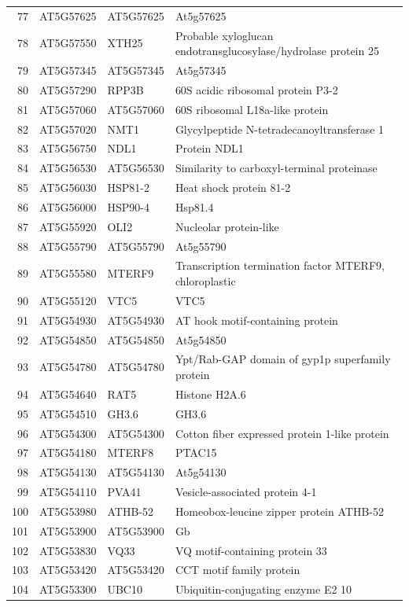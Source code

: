 \documentclass[11pt]{article}
\begin{document}
\begin{center}
\begin{tabular}{rlll}
77 & AT5G57625 & AT5G57625 & At5g57625\\
78 & AT5G57550 & XTH25 & Probable xyloglucan endotransglucosylase/hydrolase protein 25\\
79 & AT5G57345 & AT5G57345 & At5g57345\\
80 & AT5G57290 & RPP3B & 60S acidic ribosomal protein P3-2\\
81 & AT5G57060 & AT5G57060 & 60S ribosomal L18a-like protein\\
82 & AT5G57020 & NMT1 & Glycylpeptide N-tetradecanoyltransferase 1\\
83 & AT5G56750 & NDL1 & Protein NDL1\\
84 & AT5G56530 & AT5G56530 & Similarity to carboxyl-terminal proteinase\\
85 & AT5G56030 & HSP81-2 & Heat shock protein 81-2\\
86 & AT5G56000 & HSP90-4 & Hsp81.4\\
87 & AT5G55920 & OLI2 & Nucleolar protein-like\\
88 & AT5G55790 & AT5G55790 & At5g55790\\
89 & AT5G55580 & MTERF9 & Transcription termination factor MTERF9, chloroplastic\\
90 & AT5G55120 & VTC5 & VTC5\\
91 & AT5G54930 & AT5G54930 & AT hook motif-containing protein\\
92 & AT5G54850 & AT5G54850 & At5g54850\\
93 & AT5G54780 & AT5G54780 & Ypt/Rab-GAP domain of gyp1p superfamily protein\\
94 & AT5G54640 & RAT5 & Histone H2A.6\\
95 & AT5G54510 & GH3.6 & GH3.6\\
96 & AT5G54300 & AT5G54300 & Cotton fiber expressed protein 1-like protein\\
97 & AT5G54180 & MTERF8 & PTAC15\\
98 & AT5G54130 & AT5G54130 & At5g54130\\
99 & AT5G54110 & PVA41 & Vesicle-associated protein 4-1\\
100 & AT5G53980 & ATHB-52 & Homeobox-leucine zipper protein ATHB-52\\
101 & AT5G53900 & AT5G53900 & Gb\\
102 & AT5G53830 & VQ33 & VQ motif-containing protein 33\\
103 & AT5G53420 & AT5G53420 & CCT motif family protein\\
104 & AT5G53300 & UBC10 & Ubiquitin-conjugating enzyme E2 10\\

\end{tabular}
\end{center}
\end{document}
